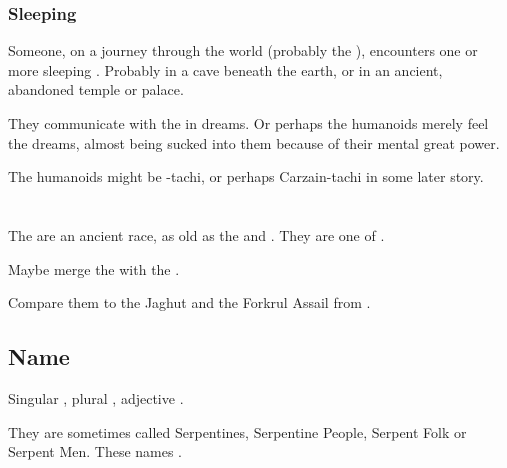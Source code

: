\subsubsection{Sleeping \ophidians}
Someone, on a journey through the world (probably the \Wylde{}), encounters one or more sleeping \ophidians{}. 
Probably in a cave beneath the earth, or in an ancient, abandoned temple or palace. 

They communicate with the \ophidians{} in dreams. 
Or perhaps the humanoids merely feel the \psp{\ophidians} dreams, almost being sucked into them because of their mental great power. 

The humanoids might be \Shilred-tachi, or perhaps Carzain-tachi in some later story. 















\section{\QuilJaar}
\index{\quiljaar}
The \quiljaaran{} are an ancient race, as old as the \dragons{} and \vorcanths. 
They are one of . 

Maybe merge the \quiljaaran{} with the \bladedpeople. 

Compare them to the Jaghut and the Forkrul Assail from \cite{StevenEriksonIanCameronEsslemont:MalazanBookoftheFallen}. 









\subsection{Name}
Singular \emph{\quiljaar{}}, plural \emph{\quiljaaran{}}, adjective \emph{\quiljaaran{}}. 

They are sometimes called Serpentines, Serpentine People, Serpent Folk or Serpent Men. 
These names . 










